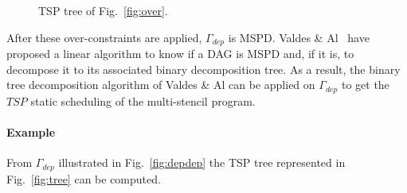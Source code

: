 \begin{figure}[h!]
\begin{center}
\caption{TSP tree of Fig.~\ref{fig:over}.}
\label{fig:solu}
\end{center}
\end{figure}

After these over-constraints are applied, $\Gamma_{dep}$ is MSPD. Valdes \& Al~\cite{Valdes:1979:RSP:800135.804393} have proposed a linear algorithm to know if a DAG is MSPD and, if it is, to decompose it to its associated binary decomposition tree. As a result, the binary tree decomposition algorithm of Valdes \& Al can be applied on $\Gamma_{dep}$ to get the $TSP$ static scheduling of the multi-stencil program.

\paragraph{\textbf{Example}} From $\Gamma_{dep}$ illustrated in Fig.~\ref{fig:depdep} the TSP tree represented in Fig.~\ref{fig:tree} can be computed.

